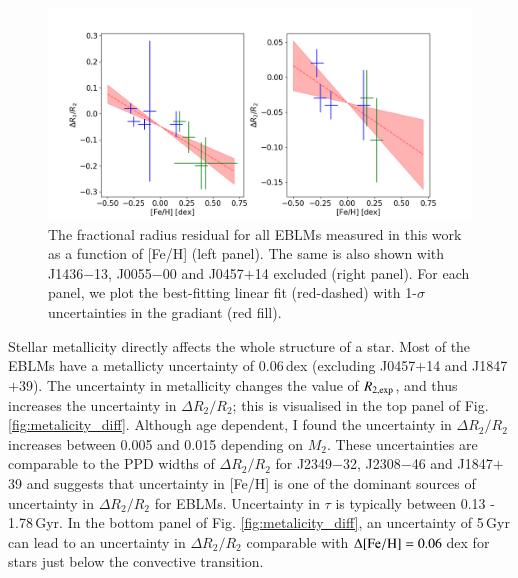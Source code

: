 \begin{figure}
    \centering
    \includegraphics[width=\textwidth]{9-Discussion/images/inflation_with_metallicity.png}
    \caption{The fractional radius residual for all EBLMs measured in this work as a function of [Fe/H] (left panel). The same is also shown with J1436$-$13, J0055$-$00 and J0457$+$14 excluded (right panel). For each panel, we plot the best-fitting linear fit (red-dashed) with 1-$\sigma$ uncertainties in the gradiant (red fill).}
    \label{discussion:fig:metallicity_trend}
\end{figure}


Stellar metallicity directly affects the whole structure of a star. Most of the EBLMs have a metallicty uncertainty of 0.06\,dex (excluding J0457$+$14 and J1847$+$39). The uncertainty in metallicity changes the value of $R_{2, \rm exp}$, and thus increases the uncertainty in $\Delta R_2 / R_2$; this is visualised in the top panel of Fig. \ref{fig:metalicity_diff}. Although age dependent, I found the uncertainty in $\Delta R_2 / R_2$ increases between 0.005 and 0.015 depending on $M_2$. These uncertainties are comparable to the PPD widths of $\Delta R_2 / R_2$ for J2349$-$32, J2308$-$46 and J1847$+$39 and suggests that uncertainty in [Fe/H] is one of the dominant sources of uncertainty in $\Delta R_2 / R_2$ for EBLMs. Uncertainty in $\tau$ is typically between 0.13 - 1.78\,Gyr. In the bottom panel of Fig. \ref{fig:metalicity_diff}, an uncertainty of 5\,Gyr can lead to an uncertainty in $\Delta R_2 / R_2$ comparable with $\Delta \rm [Fe/H] = 0.06$\,dex for stars just below the convective transition. 


